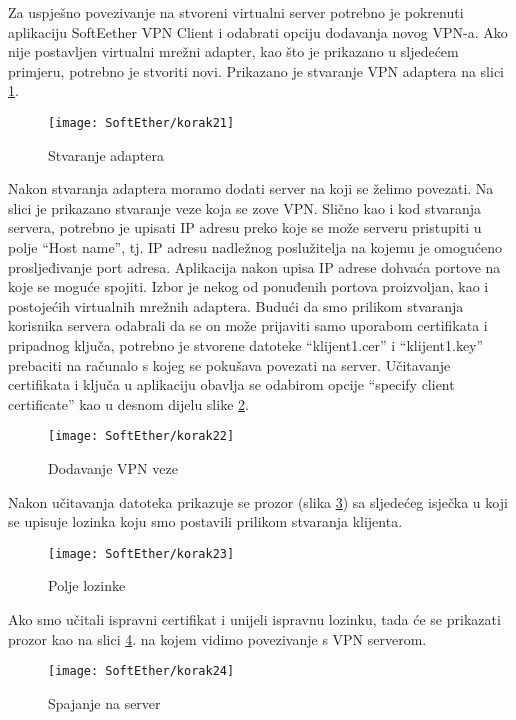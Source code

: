 \hfill \smallbreak
Za uspješno povezivanje na stvoreni virtualni server potrebno je pokrenuti aplikaciju SoftEether VPN Client i odabrati opciju dodavanja novog VPN-a. Ako nije postavljen virtualni mrežni adapter, kao što je prikazano u sljedećem primjeru, potrebno je stvoriti novi. Prikazano je stvaranje VPN adaptera na slici \ref{fig:adapter-soft}.
\begin{figure}[h!]
     \centering
     \texttt{[image: SoftEther/korak21]}
     \caption{Stvaranje adaptera}
     \label{fig:adapter-soft}
\end{figure}
\FloatBarrier
Nakon stvaranja adaptera moramo dodati server na koji se želimo povezati. Na slici je prikazano stvaranje veze koja se zove VPN. Slično kao i kod stvaranja servera, potrebno je upisati IP adresu preko koje se može serveru pristupiti u polje ``Host name'', tj. IP adresu nadležnog poslužitelja na kojemu je omogućeno prosljeđivanje port adresa. Aplikacija nakon upisa IP adrese dohvaća portove na koje se moguće spojiti. Izbor je nekog od ponuđenih portova proizvoljan, kao i postojećih virtualnih mrežnih adaptera. Budući da smo prilikom stvaranja korisnika servera odabrali da se on može prijaviti samo uporabom certifikata i pripadnog ključa, potrebno je stvorene datoteke ``klijent1.cer'' i ``klijent1.key'' prebaciti na računalo s kojeg se pokušava povezati na server. Učitavanje certifikata i ključa u aplikaciju obavlja se odabirom opcije ``specify client certificate'' kao u desnom dijelu slike \ref{fig:certif-soft}.
\begin{figure}[h!]
     \centering
     \texttt{[image: SoftEther/korak22]}
     \caption{Dodavanje VPN veze}
     \label{fig:certif-soft}
\end{figure}
\FloatBarrier
Nakon učitavanja datoteka prikazuje se prozor (slika \ref{fig:pass-soft}) sa sljedećeg isječka u koji se upisuje lozinka koju smo postavili prilikom stvaranja klijenta.
\begin{figure}[h!]
     \centering
     \texttt{[image: SoftEther/korak23]}
     \caption{Polje lozinke}
     \label{fig:pass-soft}
\end{figure}
\FloatBarrier
Ako smo učitali ispravni certifikat i unijeli ispravnu lozinku, tada će se prikazati prozor kao na slici \ref{fig:veza-soft}. na kojem vidimo povezivanje s VPN serverom.
\begin{figure}[h!]
     \centering
     \texttt{[image: SoftEther/korak24]}
     \caption{Spajanje na server}
     \label{fig:veza-soft}
\end{figure}
\FloatBarrier

